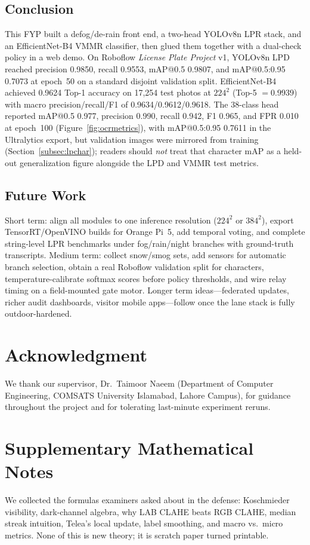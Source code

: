 \documentclass[10pt, conference]{IEEEtran}
\begin{document}
\subsection{Conclusion}
This FYP built a defog/de-rain front end, a two-head YOLOv8n LPR stack, and an EfficientNet-B4 VMMR classifier, then glued them together with a dual-check policy in a web demo. On Roboflow \emph{License Plate Project} v1, YOLOv8n LPD reached precision 0.9850, recall 0.9553, mAP@0.5 0.9807, and mAP@0.5:0.95 0.7073 at epoch~50 on a standard disjoint validation split. EfficientNet-B4 achieved 0.9624 Top-1 accuracy on 17{,}254 test photos at $224^2$ (Top-5 $=0.9939$) with macro precision/recall/F1 of 0.9634/0.9612/0.9618. The 38-class head reported mAP@0.5 0.977, precision 0.990, recall 0.942, F1 0.965, and FPR 0.010 at epoch~100 (Figure~\ref{fig:ocrmetrics}), with mAP@0.5:0.95 0.7611 in the Ultralytics export, but validation images were mirrored from training (Section~\ref{subsec:lpchar}); readers should \emph{not} treat that character mAP as a held-out generalization figure alongside the LPD and VMMR test metrics.

\subsection{Future Work}
Short term: align all modules to one inference resolution ($224^2$ or $384^2$), export TensorRT/OpenVINO builds for Orange Pi~5, add temporal voting, and complete string-level LPR benchmarks under fog/rain/night branches with ground-truth transcripts. Medium term: collect snow/smog sets, add sensors for automatic branch selection, obtain a real Roboflow validation split for characters, temperature-calibrate softmax scores before policy thresholds, and wire relay timing on a field-mounted gate motor. Longer term ideas---federated updates, richer audit dashboards, visitor mobile apps---follow once the lane stack is fully outdoor-hardened.

\section*{Acknowledgment}
We thank our supervisor, Dr.~Taimoor Naeem (Department of Computer Engineering, COMSATS University Islamabad, Lahore Campus), for guidance throughout the project and for tolerating last-minute experiment reruns.

\appendices

\section{Supplementary Mathematical Notes}
\label{app:math}
We collected the formulas examiners asked about in the defense: Koschmieder visibility, dark-channel algebra, why LAB CLAHE beats RGB CLAHE, median streak intuition, Telea's local update, label smoothing, and macro vs.\ micro metrics. None of this is new theory; it is scratch paper turned printable.
\end{document}
